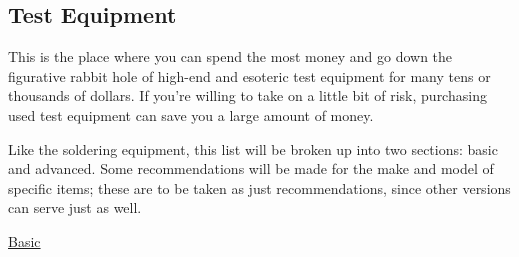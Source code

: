 \subsection{Test Equipment} %

This is the place where you can spend the most money and go down the figurative rabbit hole of high-end and esoteric test equipment for many tens or thousands of dollars. If you're willing to take on a little bit of risk, purchasing used test equipment can save you a large amount of money.

Like the soldering equipment, this list will be broken up into two sections: basic and advanced. Some recommendations will be made for the make and model of specific items; these are to be taken as just recommendations, since other versions can serve just as well.

\underline{Basic}

